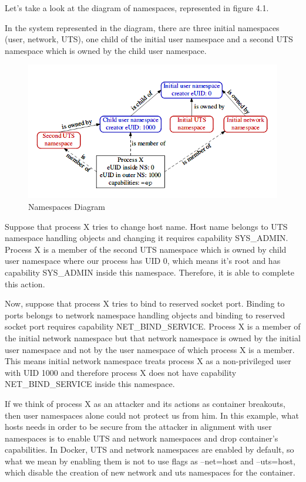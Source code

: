 Let's take a look at the diagram of namespaces, represented in figure 4.1. \cite{diagramuserns}

In the system represented in the diagram, there are three initial namespaces (user, network, UTS), one child of the initial user namespace and a second UTS namespace which is owned by the child user namespace.

\begin{figure}[h!]
  \centering
   \includegraphics[width=0.9\linewidth]{figures/userns1gm.png}
   \caption{Namespaces Diagram}
\end{figure}
\hfill\break\hfill\break

Suppose that process X tries to change host name. Host name belongs to UTS namespace handling objects and changing it requires capability SYS\_ADMIN. Process X is a member of the second UTS namespace which is owned by child user namespace where our process has UID 0, which means it's root and has capability SYS\_ADMIN inside this namespace. Therefore, it is able to complete this action.

Now, suppose that process X tries to bind to reserved socket port. Binding to ports belongs to network namespace handling objects and binding to reserved socket port requires capability NET\_BIND\_SERVICE. Process X is a member of the initial network namespace but that network namespace is owned by the initial user namespace and not by the user namespace of which process X is a member. This means initial network namespace treats process X as a non-privileged user with UID 1000 and therefore process X does not have capability NET\_BIND\_SERVICE inside this namespace.

If we think of process X as an attacker and its actions as container breakouts, then user namespaces alone could not protect us from him. In this example, what hosts needs in order to be secure from the attacker in alignment with user namespaces is to enable UTS and network namespaces and drop container's capabilities. In Docker, UTS and network namespaces are enabled by default, so what we mean by enabling them is not to use flags as --net=host and --uts=host, which disable the creation of new network and uts namespaces for the container. 

